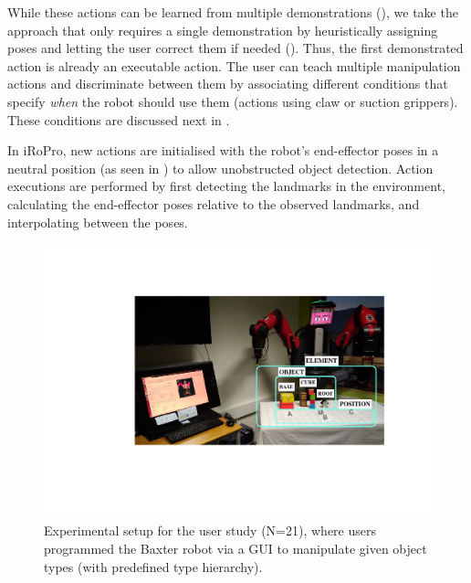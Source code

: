 While these actions can be learned from multiple demonstrations (\cite{niekum2012learning}), we take the approach that only requires a single demonstration by heuristically assigning poses and letting the user correct them if needed (\cite{alexandrova2014robot}).
Thus, the first demonstrated action is already an executable action.
The user can teach multiple manipulation actions and discriminate between them by associating different conditions that specify \textit{when} the robot should use them (\eg actions using claw or suction grippers).
These conditions are discussed next in .

In iRoPro, new actions are initialised with the robot's end-effector poses in a neutral position (as seen in ) to allow unobstructed object detection.
Action executions are performed by first detecting the landmarks in the environment, calculating the end-effector poses relative to the observed landmarks, and interpolating between the poses.


\begin{figure}[h]
	\centering
	\includegraphics[width=0.7\linewidth]{figures/dispositif.pdf}
	\caption{Experimental setup for the user study (N=21), where users programmed the Baxter robot via a GUI to manipulate given object types (with predefined type hierarchy). }
	\label{fig:dispositif}
\end{figure}



